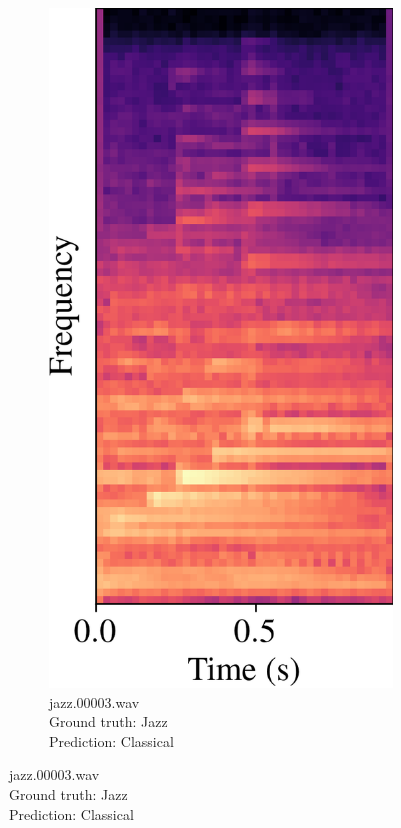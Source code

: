 \documentclass[conference]{IEEEtran}
\begin{document}
\begin{figure}[htbp]
\begin{subfigure}[b]{0.32\columnwidth}
        \label{spec_correct}
    \end{subfigure}
    \hfill
    \begin{subfigure}[b]{0.32\columnwidth}
        \centerline{\includegraphics[width=\columnwidth]{spec_incorrect_1.png}}
        \caption{jazz.00003.wav\\Ground truth: Jazz\\Prediction: Classical}

\end{subfigure}
\end{figure}
\end{document}
